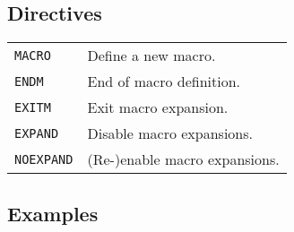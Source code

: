     \subsection{Directives}
        \begin{table}[h!]
            \begin{tabular}{ll}
                \texttt{MACRO}      & Define a new macro. \\
                \texttt{ENDM}       & End of macro definition. \\
                \texttt{EXITM}      & Exit macro expansion. \\
                \texttt{EXPAND}     & Disable macro expansions.\\
                \texttt{NOEXPAND}   & (Re-)enable macro expansions.\\
            \end{tabular}
        \end{table}

    \subsection{Examples}
